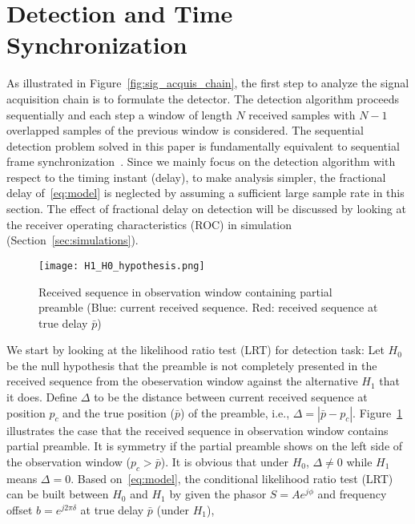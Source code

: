 \section{Detection and Time Synchronization}
\label{sec:detection}

As illustrated in Figure~\ref{fig:sig_acquis_chain}, the first step to analyze
the signal acquisition chain is to formulate the detector.
The detection algorithm proceeds sequentially and each step a window of length $N$ received samples with 
$N-1$ overlapped samples of the previous window is considered. The sequential detection problem solved 
in this paper is fundamentally equivalent to sequential frame synchronization~\cite{Massey_72,Lui_Tan_86,Scholtz_80}.
Since we mainly focus on the detection algorithm with respect to the timing instant (delay), to make analysis simpler,
the fractional delay of~\eqref{eq:model} is neglected by assuming a sufficient large sample rate in this section. 
The effect of fractional delay on detection will be discussed by looking at the receiver operating characteristics (ROC) in simulation (Section~\ref{sec:simulations}).

\begin{figure}[t]
  \centerline{\texttt{[image: H1\_H0\_hypothesis.png]}}
  \caption{Received sequence in observation window containing partial preamble (Blue: current received sequence. Red: received sequence at true delay $\bar{p}$)}
  \label{fig:H1_H0_hypothesis}
  \end{figure}

We start by looking at the likelihood ratio test (LRT) for detection task:
Let $H_0$ be the null hypothesis that the preamble is not completely presented in the received sequence from the obeservation window 
against the alternative $H_1$ that it does. 
Define $\Delta$ to be the distance between current received sequence at position $p_c$ and the true position ($\bar{p}$) of the preamble, 
i.e., $\Delta=|\bar{p}-p_c|$. Figure~\ref{fig:H1_H0_hypothesis} illustrates the case that the received sequence in observation window contains partial preamble.
It is symmetry if the partial preamble shows on the left side of the observation window ($p_c>\bar{p}$).
It is obvious that under $H_0$, $\Delta \neq 0$ while $H_1$ means $\Delta=0$. 
Based on~\eqref{eq:model}, the conditional likelihood ratio test (LRT) can be built 
between $H_0$ and $H_1$ by given the phasor $S{=}Ae^{j\phi}$ and frequency offset $b{=}e^{j2\pi \delta}$
at true delay $\bar{p}$ (under $H_1$),

